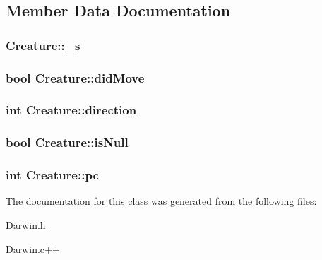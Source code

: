 \subsection{Member Data Documentation}
\hypertarget{classCreature_a1fb20eb7477dd7a763ff3d5845beae54}{
\subsubsection[{\-\_\-s}]{ Creature\-::\-\_\-s}}\label{classCreature_a1fb20eb7477dd7a763ff3d5845beae54}
\hypertarget{classCreature_ade9322f97d63a42aeb133a3c43c416ae}{
\subsubsection[{did\-Move}]{\setlength{\rightskip}{0pt plus 5cm}bool Creature\-::did\-Move\hspace{0.3cm}{\ttfamily [private]}}}\label{classCreature_ade9322f97d63a42aeb133a3c43c416ae}
\hypertarget{classCreature_a6b3f59d2ca15b6781d81c3c141509976}{
\subsubsection[{direction}]{\setlength{\rightskip}{0pt plus 5cm}int Creature\-::direction}}\label{classCreature_a6b3f59d2ca15b6781d81c3c141509976}
\hypertarget{classCreature_a38637bca6404ecf82079d00603b23f1d}{
\subsubsection[{is\-Null}]{\setlength{\rightskip}{0pt plus 5cm}bool Creature\-::is\-Null\hspace{0.3cm}{\ttfamily [private]}}}\label{classCreature_a38637bca6404ecf82079d00603b23f1d}
\hypertarget{classCreature_a81b808ceee6ddc5c0a97e0b97b19a707}{
\subsubsection[{pc}]{\setlength{\rightskip}{0pt plus 5cm}int Creature\-::pc\hspace{0.3cm}{\ttfamily [private]}}}\label{classCreature_a81b808ceee6ddc5c0a97e0b97b19a707}


The documentation for this class was generated from the following files\-:\begin{DoxyCompactItemize}
\item 
\hyperlink{Darwin_8h}{Darwin.\-h}\item 
\hyperlink{Darwin_8c_09_09}{Darwin.\-c++}\end{DoxyCompactItemize}

